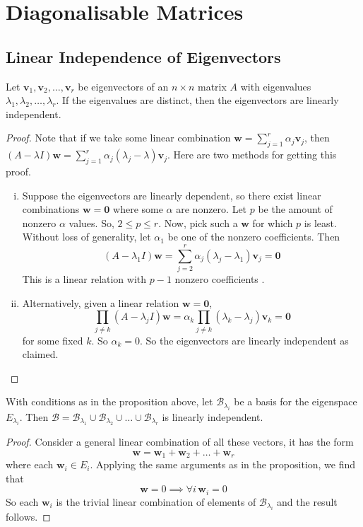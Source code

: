 \documentclass{article}
\begin{document}
	\section{Diagonalisable Matrices}
	\subsection{Linear Independence of Eigenvectors}
	\begin{proposition}
		Let $\bm v_1, \bm v_2, \dots, \bm v_r$ be eigenvectors of an $n\times n$ matrix $A$ with eigenvalues $\lambda_1, \lambda_2,\dots,\lambda_r$. If the eigenvalues are distinct, then the eigenvectors are linearly independent.
	\end{proposition}
	\begin{proof}
		Note that if we take some linear combination $\bm w = \sum_{j=1}^r \alpha_j\bm v_j$, then $(A - \lambda I)\bm w = \sum_{j=1}^r \alpha_j(\lambda_j - \lambda)\bm v_j$. Here are two methods for getting this proof.
		\begin{enumerate}[(i)]
			\item Suppose the eigenvectors are linearly dependent, so there exist linear combinations $\bm w = \bm 0$ where some $\alpha$ are nonzero. Let $p$ be the amount of nonzero $\alpha$ values. So, $2 \leq p \leq r$. Now, pick such a $\bm w$ for which $p$ is least. Without loss of generality, let $\alpha_1$ be one of the nonzero coefficients. Then
			\[ (A - \lambda_1 I)\bm w = \sum_{j=2}^r \alpha_j(\lambda_j - \lambda_1)\bm v_j = \bm 0 \]
			This is a linear relation with $p-1$ nonzero coefficients \contradiction.
			\item Alternatively, given a linear relation $\bm w=\bm 0$,
			\[ \prod_{j \neq k} (A - \lambda_j I) \bm w = \alpha_k \prod_{j \neq k} (\lambda_k - \lambda_j) \bm v_k = \bm 0 \]
			for some fixed $k$. So $\alpha_k = 0$. So the eigenvectors are linearly independent as claimed.
		\end{enumerate}
	\end{proof}
	\begin{corollary}
		With conditions as in the proposition above, let $\mathcal B_{\lambda_i}$ be a basis for the eigenspace $E_{\lambda_i}$. Then $\mathcal B = \mathcal B_{\lambda_1} \cup \mathcal B_{\lambda_2} \cup \dots \cup \mathcal B_{\lambda_r}$ is linearly independent.
	\end{corollary}
	\begin{proof}
		Consider a general linear combination of all these vectors, it has the form
		\[ \bm w = \bm w_1 + \bm w_2 + \dots + \bm w_r \]
		where each $\bm w_i \in E_i$. Applying the same arguments as in the proposition, we find that
		\[ \bm w = 0 \implies \forall i\,\bm w_i = 0 \]
		So each $\bm w_i$ is the trivial linear combination of elements of $\mathcal B_{\lambda_i}$ and the result follows.
	\end{proof}
\end{document}
